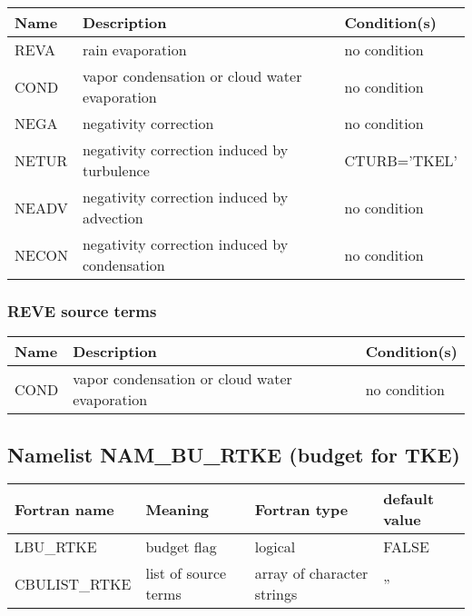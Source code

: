\begin{longtable} {|p{}|p{}|p{}|}
\hline
Name & Description & Condition(s) \\
\hline \hline
\endhead
REVA   & rain evaporation                              & no condition \\\hline
COND   & vapor condensation or cloud water evaporation & no condition \\\hline
NEGA   & negativity correction                         & no condition \\\hline
NETUR  & negativity correction induced by turbulence   & CTURB='TKEL' \\\hline
NEADV  & negativity correction induced by advection    & no condition \\\hline
NECON  & negativity correction induced by condensation & no condition \\\hline
\end{longtable}

\subsubsection{REVE source terms}

\begin{longtable} {|p{}|p{}|p{}|}
\hline
Name & Description & Condition(s) \\
\hline \hline
\endhead
COND   & vapor condensation or cloud water evaporation & no condition \\\hline
\end{longtable}


\subsection{Namelist NAM\_BU\_RTKE (budget for TKE)}

\begin{longtable} {|p{}|p{}|>{\centering}p{}|p{}<{\centering}|}
\hline
Fortran name & Meaning & Fortran type & default value \\
\hline \hline
\endhead
LBU\_RTKE & budget flag & logical & FALSE\index{LBU\_RTKE!\innam{NAM\_BU\_RTKE}} \\\hline
CBULIST\_RTKE & list of source terms & array of character strings & ''\index{CBULIST\_RTKE!\innam{NAM\_BU\_RTKE}} \\\hline
\end{longtable}

